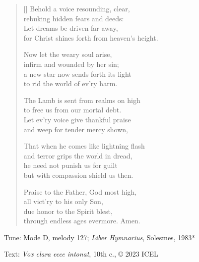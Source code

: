 \hymn

\settowidth{\versewidth}{for Christ shines forth from heaven’s height.}

\begin{verse}[\versewidth]
Behold a voice resounding, clear,\\
rebuking hidden fears and deeds:\\
Let dreams be driven far away,\\
for Christ shines forth from heaven’s height.

Now let the weary soul arise,\\
infirm and wounded by her sin;\\
a new star now sends forth its light\\
to rid the world of ev’ry harm.

The Lamb is sent from realms on high\\
to free us from our mortal debt.\\
Let ev’ry voice give thankful praise\\
and weep for tender mercy shown,

That when he comes like lightning flash\\
and terror grips the world in dread,\\
he need not punish us for guilt\\
but with compassion shield us then.

Praise to the Father, God most high,\\
all vict’ry to his only Son,\\
due honor to the Spirit blest,\\
through endless ages evermore. Amen.
\end{verse}

\begin{hymnsource}
Tune: Mode D, melody 127; \emph{Liber Hymnarius}, Solesmes, 1983*

Text: \emph{Vox clara ecce intonat}, 10th c., © 2023 ICEL
\end{hymnsource}